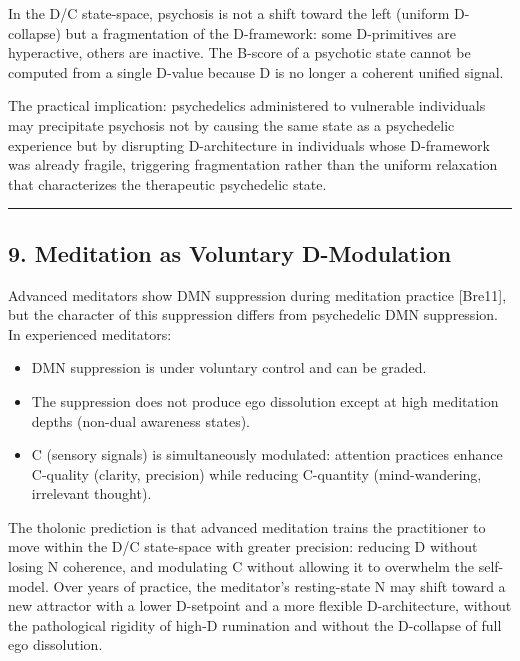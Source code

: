 \documentclass[
  11pt,
  letterpaper,
]{article}
\providecommand{\tightlist}{%
  \setlength{\itemsep}{0pt}\setlength{\parskip}{0pt}}
\begin{document}
In the D/C state-space, psychosis is not a shift toward the left
(uniform D-collapse) but a fragmentation of the D-framework: some
D-primitives are hyperactive, others are inactive. The B-score of a
psychotic state cannot be computed from a single D-value because D is no
longer a coherent unified signal.

The practical implication: psychedelics administered to vulnerable
individuals may precipitate psychosis not by causing the same state as a
psychedelic experience but by disrupting D-architecture in individuals
whose D-framework was already fragile, triggering fragmentation rather
than the uniform relaxation that characterizes the therapeutic
psychedelic state.

\begin{center}\rule{0.5\linewidth}{0.5pt}\end{center}

\subsection{9. Meditation as Voluntary
D-Modulation}\label{meditation-as-voluntary-d-modulation}

Advanced meditators show DMN suppression during meditation practice
{[}Bre11{]}, but the character of this suppression differs from
psychedelic DMN suppression. In experienced meditators:

\begin{itemize}
\tightlist
\item
  DMN suppression is under voluntary control and can be graded.
\item
  The suppression does not produce ego dissolution except at high
  meditation depths (non-dual awareness states).
\item
  C (sensory signals) is simultaneously modulated: attention practices
  enhance C-quality (clarity, precision) while reducing C-quantity
  (mind-wandering, irrelevant thought).
\end{itemize}

The tholonic prediction is that advanced meditation trains the
practitioner to move within the D/C state-space with greater precision:
reducing D without losing N coherence, and modulating C without allowing
it to overwhelm the self-model. Over years of practice, the meditator's
resting-state N may shift toward a new attractor with a lower D-setpoint
and a more flexible D-architecture, without the pathological rigidity of
high-D rumination and without the D-collapse of full ego dissolution.
\end{document}
